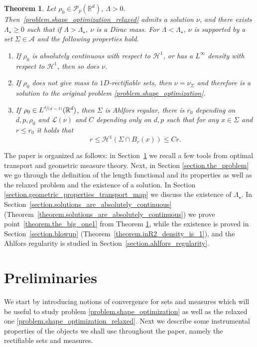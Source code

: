 \documentclass[JEP,XML,SOM,Unicode,NoFloatCountersInSection,published]{cedram}
\newcommand{\spfrac}[2]{\sfrac{#1}{(#2)}}
\newtheorem{theorem}{Theorem}[section]
\theoremstyle{definition}
\newcommand\cH{\mathcal{H}}
\newcommand{\RR}{\mathbb{R}}
\begin{document}
\begin{theorem}\label{theorem.the_big_one}
Let $\rho_0 \in \mathcal{P}_p(\RR^d)$, $\Lambda>0$. Then~\eqref{problem.shape_optimization_relaxed} admits a solution $\nu$, and there exists $\Lambda_\star \ge 0$ such that if $\Lambda>\Lambda_\star$, $\nu$ is a Dirac mass. For $\Lambda<\Lambda_\star$, $\nu$ is supported by a set $\Sigma \in \mathcal{A}$ and the following properties hold.
\begin{enumerate}
\item\label{theorem.the_big_one1}
If $\rho_0$ is absolutely continuous with respect to $\cH^1$, or has a $L^\infty$ density with respect to $\cH^1$, then so does $\nu$.
\item\label{theorem.the_big_one2}
If $\rho_0$ does not give mass to $1D$-rectifiable sets, then $\nu=\nu_\Sigma$ and therefore is a solution to the original problem \eqref{problem.shape_optimization}.
\item\label{theorem.the_big_one3}
If $\rho_0 \in L^{\spfrac{d}{d-1}}(\RR^d)$, then $\Sigma$ is Ahlfors regular, \ie there is $r_0$ depending on $d,p,\rho_0$ and $\mathcal{L}(\nu)$ and $C$ depending only on $d,p$ such that for any $x \in \Sigma$ and $r \le r_0$ it holds that
\[
r \le \cH^1(\Sigma \cap B_r(x))\le Cr.
\]
\end{enumerate}
\end{theorem}

The paper is organized as follows: in Section~\ref{section.preliminary_properties} we recall a few tools from optimal transport and geometric measure theory. Next, in Section \ref{section.the_problem} we go through the definition of the length functional and its properties as well as the relaxed problem and the existence of a solution. In Section \ref{section.geometric_properties_transport_map} we discuss
the existence of $\Lambda_\star$.
In Section~\ref{section.solutions_are_absolutely_continuous}
(Theorem~\ref{theorem.solutions_are_absolutely_continuous}) we prove point~\eqref{theorem.the_big_one1} from Theorem \ref{theorem.the_big_one}, while the existence is proved in Section~\ref{section.blowup} (Theorem~\ref{theorem.inR2_density_is_1}),
and the Ahlfors regularity is studied in Section~\ref{section.ahlfors_regularity}.

\section{Preliminaries}\label{section.preliminary_properties}
We start by introducing notions of convergence for sets and measures which will be useful to study problem \eqref{problem.shape_optimization} as well as the relaxed one \eqref{problem.shape_optimization_relaxed}. Next we describe some instrumental properties of the objects we shall use throughout the paper, namely the rectifiable sets and measures.
\end{document}
